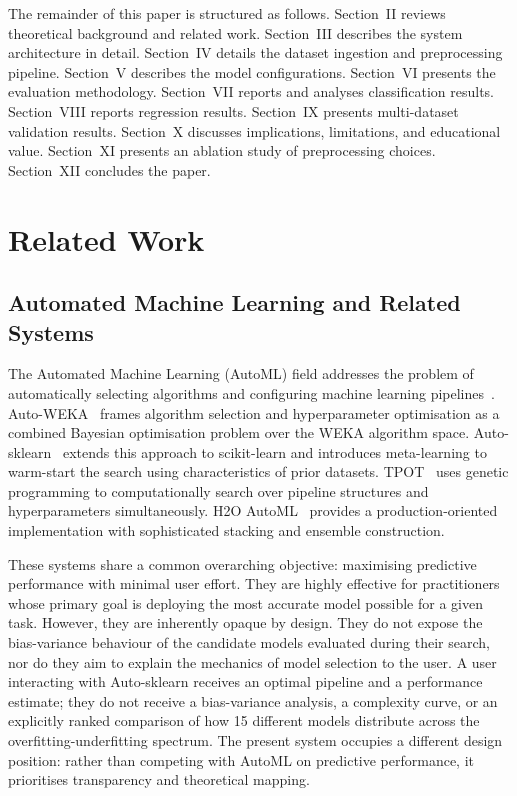 \documentclass[conference]{IEEEtran}
\begin{document}
The remainder of this paper is structured as follows. Section~II reviews theoretical background and related work. Section~III describes the system architecture in detail. Section~IV details the dataset ingestion and preprocessing pipeline. Section~V describes the model configurations. Section~VI presents the evaluation methodology. Section~VII reports and analyses classification results. Section~VIII reports regression results. Section~IX presents multi-dataset validation results. Section~X discusses implications, limitations, and educational value. Section~XI presents an ablation study of preprocessing choices. Section~XII concludes the paper.

\section{Related Work}

\subsection{Automated Machine Learning and Related Systems}

The Automated Machine Learning (AutoML) field addresses the problem of automatically selecting algorithms and configuring machine learning pipelines~\cite{b4, b5}. Auto-WEKA~\cite{b4} frames algorithm selection and hyperparameter optimisation as a combined Bayesian optimisation problem over the WEKA algorithm space. Auto-sklearn~\cite{b5} extends this approach to scikit-learn and introduces meta-learning to warm-start the search using characteristics of prior datasets. TPOT~\cite{b28} uses genetic programming to computationally search over pipeline structures and hyperparameters simultaneously. H2O AutoML~\cite{b29} provides a production-oriented implementation with sophisticated stacking and ensemble construction. 

These systems share a common overarching objective: maximising predictive performance with minimal user effort. They are highly effective for practitioners whose primary goal is deploying the most accurate model possible for a given task. However, they are inherently opaque by design. They do not expose the bias-variance behaviour of the candidate models evaluated during their search, nor do they aim to explain the mechanics of model selection to the user. A user interacting with Auto-sklearn receives an optimal pipeline and a performance estimate; they do not receive a bias-variance analysis, a complexity curve, or an explicitly ranked comparison of how 15 different models distribute across the overfitting-underfitting spectrum. The present system occupies a different design position: rather than competing with AutoML on predictive performance, it prioritises transparency and theoretical mapping.
\end{document}
